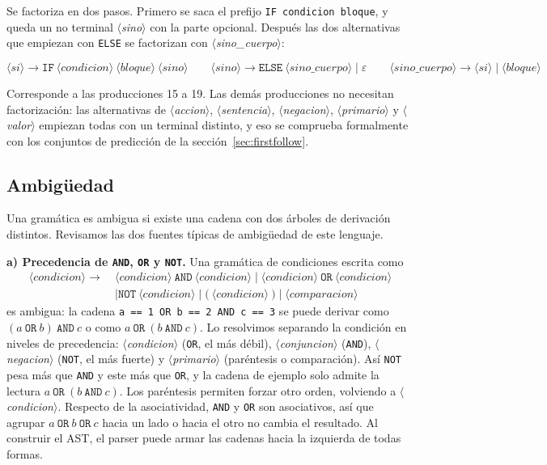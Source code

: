 \documentclass[10pt,a4paper]{article}
\newcommand{\nt}[1]{\ensuremath{\langle}\textit{#1}\ensuremath{\rangle}}   %
\newcommand{\tm}[1]{\texttt{#1}}                                          %
\begin{document}
Se factoriza en dos pasos. Primero se saca el prefijo \tm{IF condicion bloque}, y queda un no terminal
\nt{sino} con la parte opcional. Después las dos alternativas que empiezan con \tm{ELSE} se factorizan
con \nt{sino\_cuerpo}:

\[
\nt{si} \rightarrow \tm{IF}\ \nt{condicion}\ \nt{bloque}\ \nt{sino}
\qquad
\nt{sino} \rightarrow \tm{ELSE}\ \nt{sino\_cuerpo} \mid \varepsilon
\qquad
\nt{sino\_cuerpo} \rightarrow \nt{si} \mid \nt{bloque}
\]

Corresponde a las producciones 15 a 19. Las demás producciones no necesitan factorización: las
alternativas de \nt{accion}, \nt{sentencia}, \nt{negacion}, \nt{primario} y \nt{valor} empiezan todas con un
terminal distinto, y eso se comprueba formalmente con los conjuntos de predicción de la sección~\ref{sec:firstfollow}.

\subsection{Ambigüedad}
\label{sec:ambiguedad}

Una gramática es ambigua si existe una cadena con dos árboles de derivación distintos. Revisamos las
dos fuentes típicas de ambigüedad de este lenguaje.

\textbf{a) Precedencia de \tm{AND}, \tm{OR} y \tm{NOT}.} Una gramática de condiciones escrita como
\[
\begin{aligned}
\nt{condicion} \rightarrow\ &\nt{condicion}\ \tm{AND}\ \nt{condicion} \mid \nt{condicion}\ \tm{OR}\ \nt{condicion} \\
&\mid \tm{NOT}\ \nt{condicion} \mid \tm{(}\ \nt{condicion}\ \tm{)} \mid \nt{comparacion}
\end{aligned}
\]
es ambigua: la cadena \tm{a == 1 OR b == 2 AND c == 3} se puede derivar como $(a\ \tm{OR}\ b)\ \tm{AND}\ c$ o como
$a\ \tm{OR}\ (b\ \tm{AND}\ c)$. Lo resolvimos separando la condición en niveles de precedencia:
\nt{condicion} (\tm{OR}, el más débil), \nt{conjuncion} (\tm{AND}), \nt{negacion} (\tm{NOT}, el más fuerte) y
\nt{primario} (paréntesis o comparación). Así \tm{NOT} pesa más que \tm{AND} y este más que \tm{OR}, y la
cadena de ejemplo solo admite la lectura $a\ \tm{OR}\ (b\ \tm{AND}\ c)$. Los paréntesis permiten forzar otro orden,
volviendo a \nt{condicion}. Respecto de la asociatividad, \tm{AND} y \tm{OR} son asociativos, así que agrupar
$a\ \tm{OR}\ b\ \tm{OR}\ c$ hacia un lado o hacia el otro no cambia el resultado. Al construir el AST, el parser puede
armar las cadenas hacia la izquierda de todas formas.
\end{document}
